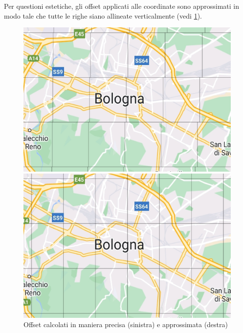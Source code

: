 \documentclass[11pt]{article}
\begin{document}
Per questioni estetiche, gli offset applicati alle coordinate sono approssimati in modo tale che tutte le righe siano allineate verticalmente (vedi \cref{fig:tile_offset}).
\begin{figure}[h]
    \centering
    \begin{minipage}[b]{0.45\textwidth}
      \includegraphics[width=\textwidth]{./img/tile_no_approx.jpg}
    \end{minipage}
    \hfill
    \begin{minipage}[b]{0.45\textwidth}
      \includegraphics[width=\textwidth]{./img/tile_approx.jpg}
    \end{minipage}
    \caption{Offset calcolati in maniera precisa (sinistra) e approssimata (destra)} \label{fig:tile_offset}
\end{figure}
\end{document}
